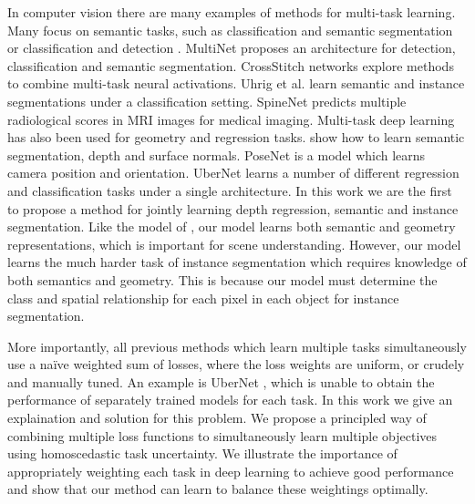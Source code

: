 In computer vision there are many examples of methods for multi-task learning. Many focus on semantic tasks, such as classification and semantic segmentation \citep{liao2016understand} or classification and detection \citep{sermanet2013overfeat}. MultiNet \citep{teichmann2016multinet} proposes an architecture for detection, classification and semantic segmentation. CrossStitch networks \citep{misra2016cross} explore methods to combine multi-task neural activations. Uhrig et al. \citep{uhrig2016pixel} learn semantic and instance segmentations under a classification setting. SpineNet \citep{jamaludin2016spinenet} predicts multiple radiological scores in MRI images for medical imaging. Multi-task deep learning has also been used for geometry and regression tasks. \citep{eigen2015predicting} show how to learn semantic segmentation, depth and surface normals. PoseNet \citep{kendall2015posenet} is a model which learns camera position and orientation. UberNet \citep{kokkinos2016ubernet} learns a number of different regression and classification tasks under a single architecture. In this work we are the first to propose a method for jointly learning depth regression, semantic and instance segmentation. Like the model of \citet{eigen2015predicting}, our model learns both semantic and geometry representations, which is important for scene understanding. However, our model learns the much harder task of instance segmentation which requires knowledge of both semantics and geometry. This is because our model must determine the class and spatial relationship for each pixel in each object for instance segmentation.

More importantly, all previous methods which learn multiple tasks simultaneously use a na{\"i}ve weighted sum of losses, where the loss weights are uniform, or crudely and manually tuned. An example is UberNet \citep{kokkinos2016ubernet}, which is unable to obtain the performance of separately trained models for each task. In this work we give an explaination and solution for this problem. We propose a principled way of combining multiple loss functions to simultaneously learn multiple objectives using homoscedastic task uncertainty. We illustrate the importance of appropriately weighting each task in deep learning to achieve good performance and show that our method can learn to balance these weightings optimally.




